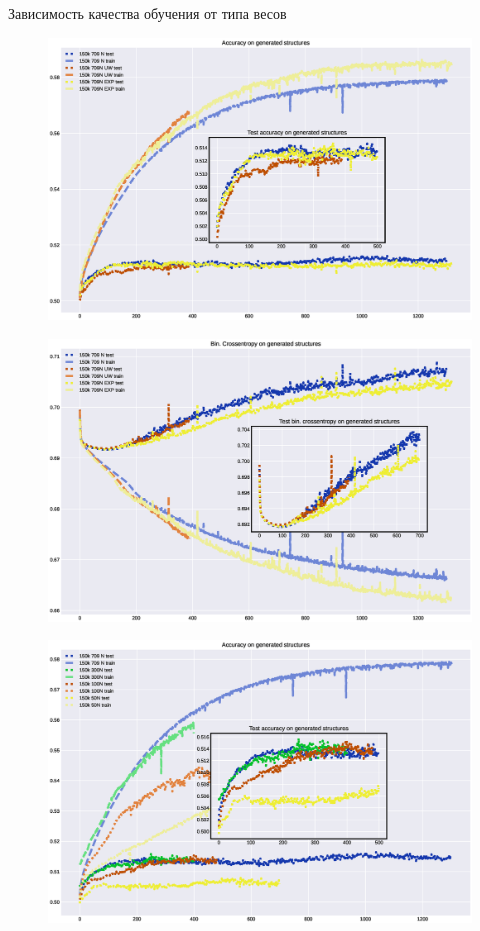 \documentclass{article}
\begin{document}
Зависимость качества обучения от типа весов
\begin{figure}[h!tp]
\centering
\includegraphics[scale=.500]{imgs/acc-weight.eps}
\caption{}
\label{}
\end{figure}

\begin{figure}[h!tp]
\centering
\includegraphics[scale=.500]{imgs/loss-weight.eps}
\caption{}
\label{}
\end{figure}


\begin{figure}[h!tp]
\centering
\includegraphics[scale=.500]{imgs/acc-lsize.eps}
\caption{}
\label{}
\end{figure}
\end{document}
